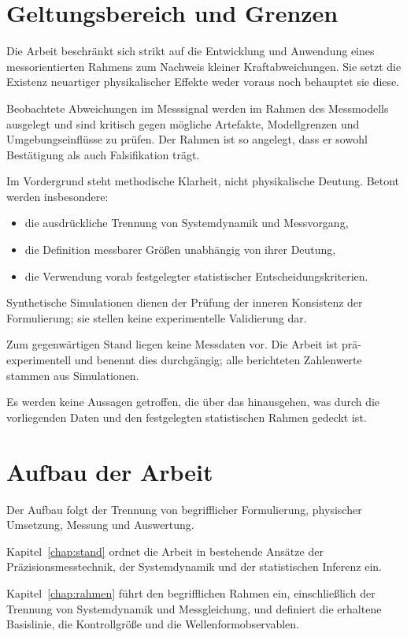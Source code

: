 \documentclass[12pt,a4paper]{report}
\begin{document}
\section{Geltungsbereich und Grenzen}

Die Arbeit beschränkt sich strikt auf die Entwicklung und Anwendung eines
messorientierten Rahmens zum Nachweis kleiner Kraftabweichungen. Sie
setzt die Existenz neuartiger physikalischer Effekte weder voraus noch
behauptet sie diese.

Beobachtete Abweichungen im Messsignal werden im Rahmen des Messmodells
ausgelegt und sind kritisch gegen mögliche Artefakte, Modellgrenzen und
Umgebungseinflüsse zu prüfen. Der Rahmen ist so angelegt, dass er sowohl
Bestätigung als auch Falsifikation trägt.

Im Vordergrund steht methodische Klarheit, nicht physikalische Deutung.
Betont werden insbesondere:

\begin{itemize}
\item die ausdrückliche Trennung von Systemdynamik und Messvorgang,
\item die Definition messbarer Größen unabhängig von ihrer Deutung,
\item die Verwendung vorab festgelegter statistischer
      Entscheidungskriterien.
\end{itemize}

Synthetische Simulationen dienen der Prüfung der inneren Konsistenz der
Formulierung; sie stellen keine experimentelle Validierung dar.

Zum gegenwärtigen Stand liegen keine Messdaten vor. Die Arbeit ist
prä-experimentell und benennt dies durchgängig; alle berichteten
Zahlenwerte stammen aus Simulationen.

Es werden keine Aussagen getroffen, die über das hinausgehen, was durch
die vorliegenden Daten und den festgelegten statistischen Rahmen gedeckt
ist.

\section{Aufbau der Arbeit}

Der Aufbau folgt der Trennung von begrifflicher Formulierung, physischer
Umsetzung, Messung und Auswertung.

Kapitel~\ref{chap:stand} ordnet die Arbeit in bestehende Ansätze der
Präzisionsmesstechnik, der Systemdynamik und der statistischen
Inferenz ein.

Kapitel~\ref{chap:rahmen} führt den begrifflichen Rahmen ein, einschließlich der
Trennung von Systemdynamik und Messgleichung, und definiert die
erhaltene Basislinie, die Kontrollgröße und die Wellenformobservablen.
\end{document}
